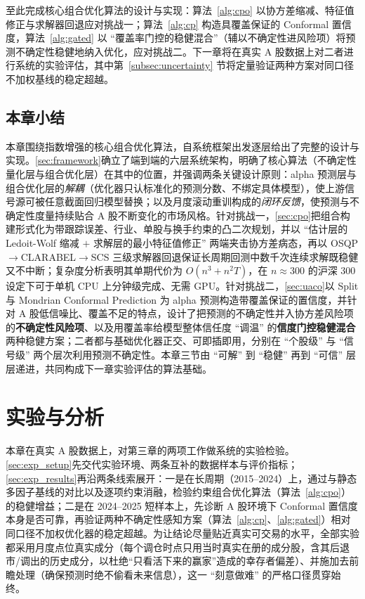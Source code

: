 至此完成核心组合优化算法的设计与实现：算法~\ref{alg:cpo} 以协方差缩减、特征值修正与求解器回退应对挑战一；算法~\ref{alg:cp} 构造具覆盖保证的 Conformal 置信度，算法~\ref{alg:gated} 以 ``覆盖率门控的稳健混合''（辅以不确定性进风险项）将预测不确定性稳健地纳入优化，应对挑战二。下一章将在真实 A 股数据上对二者进行系统的实验评估，其中第~\ref{subsec:uncertainty} 节将定量验证两种方案对同口径不加权基线的稳定超越。

\section{本章小结}
本章围绕指数增强的核心组合优化算法，自系统框架出发逐层给出了完整的设计与实现。\ref{sec:framework}确立了端到端的六层系统架构，明确了核心算法（不确定性量化层与组合优化层）在其中的位置，并强调两条关键设计原则：alpha 预测层与组合优化层的\emph{解耦}（优化器只认标准化的预测分数、不绑定具体模型），使上游信号源可被任意截面回归模型替换；以及月度滚动重训构成的\emph{闭环反馈}，使预测与不确定性度量持续贴合 A 股不断变化的市场风格。针对挑战一，\ref{sec:cpo}把组合构建形式化为带跟踪误差、行业、单股与换手约束的凸二次规划，并以 ``估计层的 Ledoit-Wolf 缩减 $+$ 求解层的最小特征值修正'' 两端夹击协方差病态，再以 OSQP$\to$CLARABEL$\to$SCS 三级求解器回退保证长周期回测中数千次连续求解既稳健又不中断；复杂度分析表明其单期代价为 $O(n^3+n^2T)$，在 $n\approx300$ 的沪深 300 设定下可于单机 CPU 上分钟级完成、无需 GPU。针对挑战二，\ref{sec:uaco}以 Split 与 Mondrian Conformal Prediction 为 alpha 预测构造带覆盖保证的置信度，并针对 A 股低信噪比、覆盖不足的特点，设计了把预测的不确定性并入协方差风险项的\textbf{不确定性风险项}、以及用覆盖率给模型整体信任度 ``调温'' 的\textbf{信度门控稳健混合}两种稳健方案；二者都与基础优化器正交、可即插即用，分别在 ``个股级'' 与 ``信号级'' 两个层次利用预测不确定性。本章三节由 ``可解'' 到 ``稳健'' 再到 ``可信'' 层层递进，共同构成下一章实验评估的算法基础。

\chapter{实验与分析}

本章在真实 A 股数据上，对第三章的两项工作做系统的实验检验。\ref{sec:exp_setup}先交代实验环境、两条互补的数据样本与评价指标；\ref{sec:exp_results}再沿两条线索展开：一是在长周期（2015--2024）上，通过与静态多因子基线的对比以及逐项约束消融，检验约束组合优化算法（算法~\ref{alg:cpo}）的稳健增益；二是在 2024--2025 短样本上，先诊断 A 股环境下 Conformal 置信度本身是否可靠，再验证两种不确定性感知方案（算法~\ref{alg:cp}、\ref{alg:gated}）相对同口径不加权优化器的稳定超越。为让结论尽量贴近真实可交易的水平，全部实验都采用月度点位真实成分（每个调仓时点只用当时真实在册的成分股，含其后退市/调出的历史成分，以杜绝``只看活下来的赢家''造成的幸存者偏差）、并施加去前瞻处理（确保预测时绝不偷看未来信息），这一 ``刻意做难'' 的严格口径贯穿始终。

